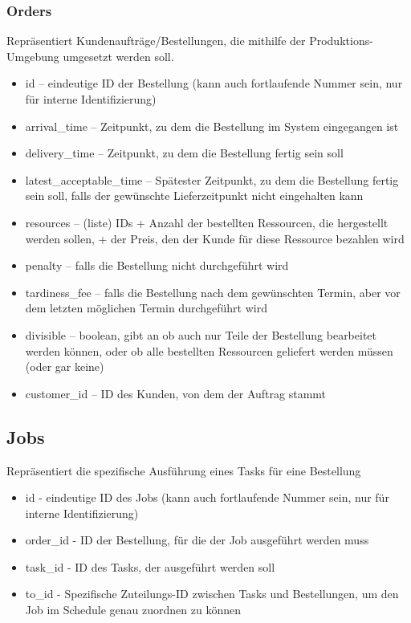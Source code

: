 \documentclass[a4paper,12pt,twoside]{scrreprt}
\begin{document}
\subsubsection*{Orders}
Repräsentiert Kundenaufträge/Bestellungen, die mithilfe der Produktions-Umgebung umgesetzt werden soll.
\begin{itemize}
	\item id – eindeutige ID der Bestellung (kann auch fortlaufende Nummer sein, nur für interne Identifizierung)
	\item arrival\_time – Zeitpunkt, zu dem die Bestellung im System eingegangen ist
	\item delivery\_time – Zeitpunkt, zu dem die Bestellung fertig sein soll
	\item latest\_acceptable\_time – Spätester Zeitpunkt, zu dem die Bestellung fertig sein soll, 
	falls der gewünschte Lieferzeitpunkt nicht eingehalten kann
	\item resources – (liste) IDs + Anzahl der bestellten Ressourcen, die hergestellt werden sollen, + der Preis, den der Kunde für diese Ressource bezahlen wird
	\item penalty – falls die Bestellung nicht durchgeführt wird
	\item tardiness\_fee – falls die Bestellung nach dem gewünschten Termin, aber vor dem letzten möglichen Termin durchgeführt wird
	\item divisible – boolean, gibt an ob auch nur Teile der Bestellung bearbeitet werden können, oder ob alle bestellten Ressourcen geliefert werden müssen (oder gar keine)
	\item customer\_id – ID des Kunden, von dem der Auftrag stammt
\end{itemize}

\subsection*{Jobs}
Repräsentiert die spezifische Ausführung eines Tasks für eine Bestellung
\begin{itemize}
	\item id - eindeutige ID des Jobs (kann auch fortlaufende Nummer sein, nur für interne Identifizierung)
	\item order\_id - ID der Bestellung, für die der Job ausgeführt werden muss
	\item task\_id - ID des Tasks, der ausgeführt werden soll
	\item to\_id - Spezifische Zuteilungs-ID zwischen Tasks und Bestellungen, um den Job im Schedule genau zuordnen zu können
\end{itemize}
\end{document}
